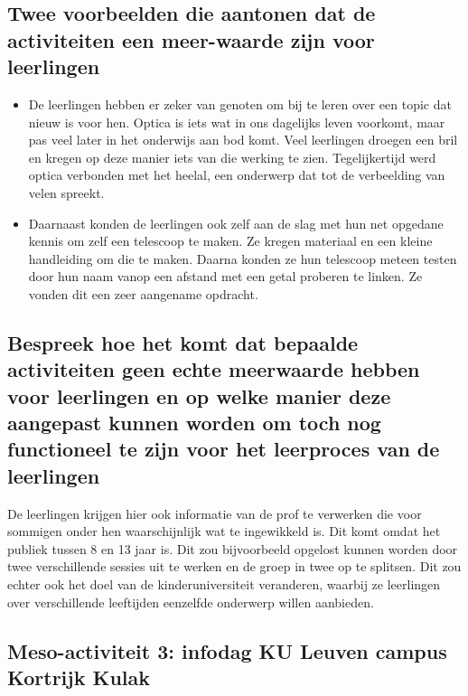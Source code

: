 \documentclass[a4paper,12pt,twoside]{article}%
\begin{document}
	\subsection{Twee voorbeelden die aantonen dat de activiteiten een meer-waarde zijn voor leerlingen}
	\begin{itemize}
		\item De leerlingen hebben er zeker van genoten om bij te leren over een topic dat nieuw is voor hen. Optica is iets wat in ons dagelijks leven voorkomt, maar pas veel later in het onderwijs aan bod komt. Veel leerlingen droegen een bril en kregen op deze manier iets van die werking te zien. Tegelijkertijd werd optica verbonden met het heelal, een onderwerp dat tot de verbeelding van velen spreekt.
		\item Daarnaast konden de leerlingen ook zelf aan de slag met hun net opgedane kennis om zelf een telescoop te maken. Ze kregen materiaal en een kleine handleiding om die te maken. Daarna konden ze hun telescoop meteen testen door hun naam vanop een afstand met een getal proberen te linken. Ze vonden dit een zeer aangename opdracht.
	\end{itemize}
	
	\subsection{Bespreek hoe het komt dat bepaalde activiteiten geen echte meerwaarde hebben voor leerlingen en op welke manier deze aangepast kunnen worden om toch nog functioneel te zijn voor het leerproces van de leerlingen}
	De leerlingen krijgen hier ook informatie van de prof te verwerken die voor sommigen onder hen waarschijnlijk wat te ingewikkeld is. Dit komt omdat het publiek tussen 8 en 13 jaar is. Dit zou bijvoorbeeld opgelost kunnen worden door twee verschillende sessies uit te werken en de groep in twee op te splitsen. Dit zou echter ook het doel van de kinderuniversiteit veranderen, waarbij ze leerlingen over verschillende leeftijden eenzelfde onderwerp willen aanbieden.
	
	
	
	\subsection{Meso-activiteit 3: infodag KU Leuven campus Kortrijk Kulak}
\end{document}
